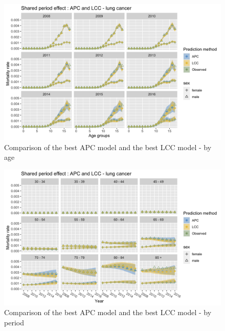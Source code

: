 \begin{figure}[h!]
    \centering
    \includegraphics[width = .8\linewidth]{real-data/real-data-multivariate/Figures/multivariate-comparison-by-age-lung.png}
    \caption{Comparison of the best APC model and the best LCC model - by age}
    \label{fig:mv-LCC-by-period-lung}
\end{figure}

\begin{figure}[h!]
    \centering
    \includegraphics[width = .8\linewidth]{real-data/real-data-multivariate/Figures/multivariate-comparison-by-period-lung.png}
    \caption{Comparison of the best APC model and the best LCC model - by period}
    \label{fig:mv-APC-by-period-lung}
\end{figure}


